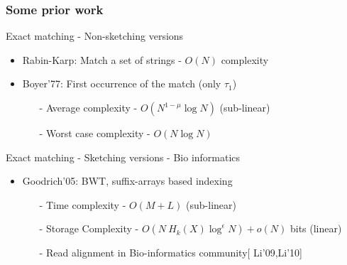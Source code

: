 \documentclass[10pt,xcolor=table]{beamer}
\begin{document}
\begin{frame} \frametitle{Some prior work}
	\vspace{-0.2cm}
	 \begin{block}{Exact matching - Non-sketching versions}	 	
	 	\begin{itemize}
            \item  {Rabin-Karp}: Match a set of strings - $O(N)$ complexity
	 		\item  {Boyer'77}: First occurrence of the match (only $\tau_1$)	 		
	 		\begin{itemize}
	 			\item[-] Average complexity - $O(N^{1-\mu} \log N)$ (sub-linear)
	 			\item[-] Worst case complexity - $O(N \log N)$
	 		\end{itemize}	
	 	\end{itemize}
	 \end{block}
	
	 \begin{block}{Exact matching - Sketching versions - Bio informatics} 	
	 	\begin{itemize}
	 		\item  {Goodrich'05}: BWT, suffix-arrays based indexing
	 		\begin{itemize}
	 			\item[-] Time complexity - $O(M + L)$ (sub-linear)
	 			\item[-] Storage Complexity - $O(N~H_k(X) \log^\epsilon N) + o(N)$ bits  (linear)
	 			\item[-] Read alignment in Bio-informatics community[ {\color{blue}Li'09,Li'10}]
	 		\end{itemize}	 		
	 	\end{itemize}
	 \end{block}
\end{frame}
\end{document}
